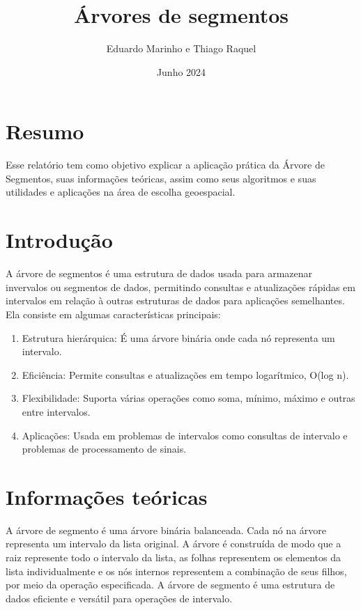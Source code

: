 \documentclass{article}
\title{Árvores de segmentos}
\author{Eduardo Marinho e Thiago Raquel}
\date{Junho 2024}
\begin{document}
\maketitle

\section{Resumo} 
\leavevmode
Esse relatório tem como objetivo explicar a aplicação prática da Árvore de Segmentos, suas informações teóricas, assim como seus algoritmos e suas utilidades e aplicações na área de escolha geoespacial.

\section{Introdução}
\indent A árvore de segmentos é uma estrutura de dados usada para armazenar invervalos ou segmentos de dados, permitindo consultas e atualizações rápidas em intervalos em relação à outras estruturas de dados para aplicações semelhantes. Ela consiste em algumas características principais:
\begin{enumerate}
\item Estrutura hierárquica: É uma árvore binária onde cada nó representa um intervalo.
\item Eficiência: Permite consultas e atualizações em tempo logarítmico, O(log n). 
\item Flexibilidade: Suporta várias operações como soma, mínimo, máximo e outras entre intervalos. 
\item Aplicações: Usada em problemas de intervalos como consultas de intervalo e problemas de processamento de sinais. 
\end{enumerate}


\section{Informações teóricas}
A árvore de segmento é uma árvore binária balanceada. Cada nó na árvore representa um intervalo da lista original.
A árvore é construída de modo que a raiz represente todo o intervalo da lista, as folhas representem os elementos
da lista individualmente e os nós internos representem a combinação de seus filhos, por meio da operação especificada.
A árvore de segmento é uma estrutura de dados eficiente e versátil para operações de intervalo.
\end{document}
